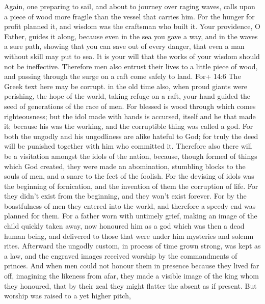  Again, one preparing to sail, and about to journey over
raging waves, calls upon a piece of wood more fragile than the vessel
that carries him.  For the hunger for profit planned it, and
wisdom was the craftsman who built it.  Your providence, O
Father, guides it along, because even in the sea you gave a way, and in
the waves a sure path,  showing that you can save out of
every danger, that even a man without skill may put to sea. 
It is your will that the works of your wisdom should not be ineffective.
Therefore men also entrust their lives to a little piece of wood, and
passing through the surge on a raft come safely to land. 
For+ 14:6 The Greek text here may be corrupt. in the old time also, when
proud giants were perishing, the hope of the world, taking refuge on a
raft, your hand guided the seed of generations of the race of men.
 For blessed is wood through which comes righteousness;
 but the idol made with hands is accursed, itself and he
that made it; because his was the working, and the corruptible thing was
called a god.  For both the ungodly and his ungodliness are
alike hateful to God;  for truly the deed will be punished
together with him who committed it.  Therefore also there
will be a visitation amongst the idols of the nation, because, though
formed of things which God created, they were made an abomination,
stumbling blocks to the souls of men, and a snare to the feet of the
foolish.  For the devising of idols was the beginning of
fornication, and the invention of them the corruption of life.
 For they didn't exist from the beginning, and they won't
exist forever.  For by the boastfulness of men they entered
into the world, and therefore a speedy end was planned for them.
 For a father worn with untimely grief, making an image of
the child quickly taken away, now honoured him as a god which was then a
dead human being, and delivered to those that were under him mysteries
and solemn rites.  Afterward the ungodly custom, in process
of time grown strong, was kept as a law, and the engraved images
received worship by the commandments of princes.  And when
men could not honour them in presence because they lived far off,
imagining the likeness from afar, they made a visible image of the king
whom they honoured, that by their zeal they might flatter the absent as
if present.  But worship was raised to a yet higher pitch,

